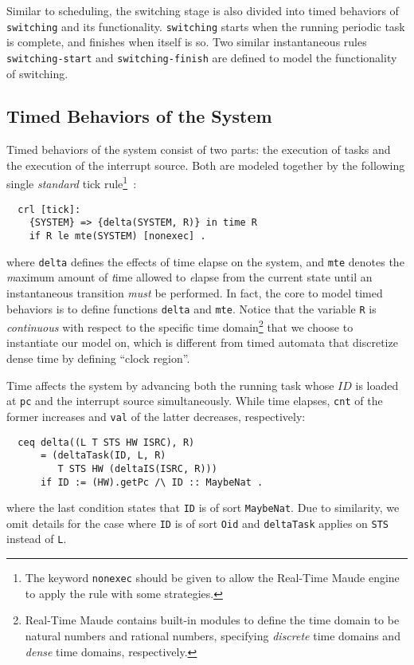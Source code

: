 \documentclass[10pt,journal]{IEEEtran}
\newcommand{\hide}[1]{\ignorespaces}
\begin{document}
{Similar to scheduling, the switching stage is also divided into timed
behaviors of \verb|switching| and its functionality. \verb|switching|
starts when the running periodic task is complete, and finishes when
itself is so. Two similar instantaneous rules \verb|switching-start|
and \verb|switching-finish| are defined to model the functionality of
switching. 
\hide{
\begin{verbatim}
  crl [task-finish] :
    (L T STS HW ISRC) 
    => (SYSTEM).startSwitching
    if SYSTEM := (L T STS HW ISRC)
       /\ some N := (SYSTEM).running
       /\ some N isComplete?in L .
  crl [switching-finish] :
    (L T STS HW ISRC) 
    => (SYSTEM).finishSwitching
    if SYSTEM := (L T STS HW ISRC)
       /\ (SYSTEM).running == switching
       /\ switching isComplete?in STS .
\end{verbatim}
}

\subsection{Timed Behaviors of the System}
\label{ss:timedbehavior}
Timed behaviors of the system consist of two parts: the execution of
tasks and the execution of the interrupt source. Both are modeled
together by the following single \emph{standard} tick
rule\footnote{The keyword \texttt{nonexec} should be given to allow
  the Real-Time Maude engine to apply the rule with some
  strategies.}~\cite{DBLP:journals/entcs/OlveczkyM07a}:
\begin{verbatim}
  crl [tick]:
    {SYSTEM} => {delta(SYSTEM, R)} in time R 
    if R le mte(SYSTEM) [nonexec] .
\end{verbatim}
where \verb|delta| defines the effects of time elapse on the system,
and \verb|mte| denotes the \emph{m}aximum amount of \emph{t}ime
allowed to \emph{e}lapse from the current state until an instantaneous
transition \emph{must} be performed. In fact, the core to model timed
behaviors is to define functions \verb|delta| and \verb|mte|. Notice
that the variable \verb|R| is \emph{continuous} with respect to the
specific time domain\footnote{Real-Time Maude contains built-in
  modules to define the time domain to be natural numbers and rational
  numbers, specifying \emph{discrete} time domains and \emph{dense}
  time domains, respectively.}  that we choose to instantiate our
model on, which is different from timed automata that discretize dense
time by defining ``clock region''.

Time affects the system by advancing both the running task whose $ID$
is loaded at \verb|pc| and the interrupt source simultaneously.  While
time elapses, \verb|cnt| of the former increases and \verb|val| of the
latter decreases, respectively:
\begin{verbatim}
  ceq delta((L T STS HW ISRC), R)
      = (deltaTask(ID, L, R) 
         T STS HW (deltaIS(ISRC, R)))
      if ID := (HW).getPc /\ ID :: MaybeNat .
\end{verbatim}
where the last condition states that \verb|ID| is of sort
\verb|MaybeNat|. Due to similarity, we omit details for the case where
\verb|ID| is of sort \verb|Oid| and \verb|deltaTask| applies on
\verb|STS| instead of \verb|L|.

}
\end{document}
